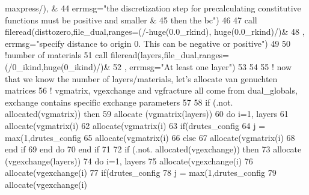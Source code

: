 \begin{DoxyCode}
      maxpress/),  &
44                 errmsg=\textcolor{stringliteral}{"the discretization step for precalculating constitutive functions must be positive
       and smaller &}
45 \textcolor{stringliteral}{}\textcolor{stringliteral}{                then the bc"})
46 
47       \textcolor{keyword}{call }fileread(disttozero,file\_dual,ranges=(/-huge(0.0\_rkind), huge(0.0\_rkind)/)&
48       , errmsg=\textcolor{stringliteral}{"specify distance to origin 0. This can be negative or positive"})
49       
50       \textcolor{comment}{!number of materials}
51       \textcolor{keyword}{call }fileread(layers,file\_dual,ranges=(/0\_ikind,huge(0\_ikind)/)&
52       , errmsg=\textcolor{stringliteral}{"At least one layer"})
53       
54 
55       \textcolor{comment}{! now that we know the number of layers/materials, let's allocate van genuchten matrices }
56       \textcolor{comment}{! vgmatrix, vgexchange and vgfracture all come from dual\_globals, exchange contains specific exchange
       parameters}
57       
58       \textcolor{keywordflow}{if} (.not. \textcolor{keyword}{allocated}(vgmatrix)) \textcolor{keywordflow}{then}
59         \textcolor{keyword}{allocate} (vgmatrix(layers))
60         \textcolor{keywordflow}{do} i=1, layers
61             \textcolor{keyword}{allocate}(vgmatrix(i)%
62             \textcolor{keyword}{allocate}(vgmatrix(i)%
63             \textcolor{keywordflow}{if}(drutes_config%
64                 j = max(1,drutes_config%
65                 \textcolor{keyword}{allocate}(vgmatrix(i)%
66             \textcolor{keywordflow}{else}
67                 \textcolor{keyword}{allocate}(vgmatrix(i)%
68 \textcolor{keywordflow}{            end if}              
69 \textcolor{keywordflow}{        end do}
70 \textcolor{keywordflow}{      end if}
71       
72       \textcolor{keywordflow}{if} (.not. \textcolor{keyword}{allocated}(vgexchange)) \textcolor{keywordflow}{then}
73         \textcolor{keyword}{allocate} (vgexchange(layers))
74         \textcolor{keywordflow}{do} i=1, layers
75             \textcolor{keyword}{allocate}(vgexchange(i)%
76             \textcolor{keyword}{allocate}(vgexchange(i)%
77             \textcolor{keywordflow}{if}(drutes_config%
78                 j = max(1,drutes_config%
79                 \textcolor{keyword}{allocate}(vgexchange(i)%

\end{DoxyCode}
